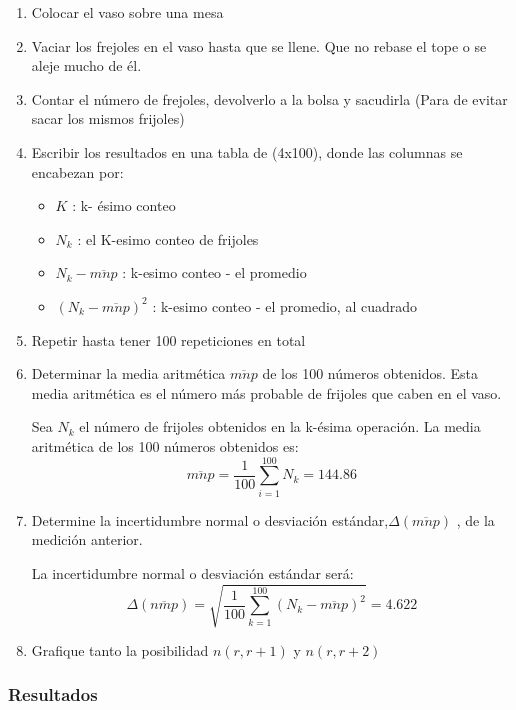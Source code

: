 \begin{enumerate}
    \item Colocar el vaso sobre una mesa
    \item Vaciar los frejoles en el vaso hasta que se llene. Que no rebase el tope o se aleje mucho de él.
    \item Contar el número de frejoles, devolverlo a la bolsa y sacudirla (Para de evitar sacar los mismos frijoles)
    \item Escribir los resultados en una tabla de (4x100), donde las columnas se encabezan por:
    \begin{itemize}
        \item $K$ : k- ésimo conteo 
        \item $N_k$ : el K-esimo conteo de frijoles
        \item $N_k - \overline{mnp}$ :  k-esimo conteo - el promedio 
        \item $(N_k - \overline{mnp})^2$ : k-esimo conteo - el promedio, al cuadrado
    \end{itemize}
    \item Repetir hasta tener 100 repeticiones en total
    \item Determinar la media aritmética $\overline{mnp}$ de los 100 números obtenidos. Esta media aritmética es el número más probable de frijoles que caben en el vaso.

    Sea $N_k$ el número de frijoles obtenidos en la k-ésima operación. La media aritmética de los 100 números obtenidos es:
    \begin{equation*}
        \overline{mnp}=\dfrac{1}{100}\sum_{i=1}^{100} N_k = 144.86
    \end{equation*}
    \item Determine la incertidumbre normal o desviación estándar,$\Delta(\overline{mnp})$ , de la medición anterior.

    La incertidumbre normal o desviación estándar será:
    \begin{equation*}
    \Delta(\overline{n m p})=\sqrt{\frac{1}{100} \sum_{k=1}^{100}\left(N_k-\overline{mnp}\right)^2}=4.622
    \end{equation*}
    \item Grafique tanto la posibilidad $n(r,r+1)$ y $n(r,r+2)$

\end{enumerate}

\newpage
\subsubsection{Resultados} 

